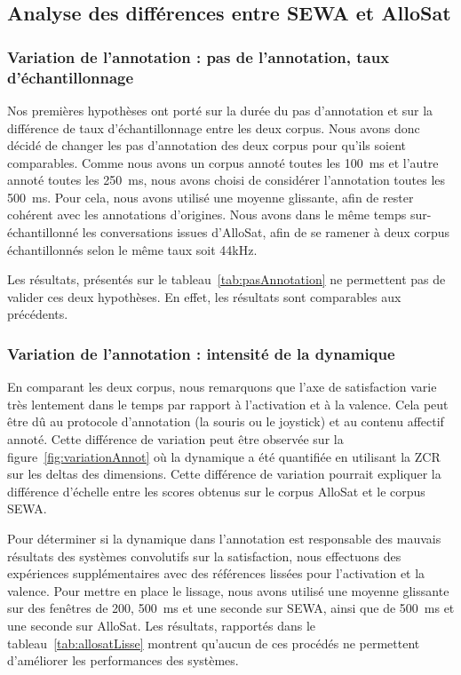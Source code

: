 \subsection{Analyse des différences entre SEWA et AlloSat}

\subsubsection{Variation de l'annotation : pas de l'annotation, taux d'échantillonnage}
Nos premières hypothèses ont porté sur la durée du pas d'annotation et sur la différence de taux d'échantillonnage entre les deux corpus. Nous avons donc décidé de changer les pas d'annotation des deux corpus pour qu'ils soient comparables. Comme nous avons un corpus annoté toutes les 100~ms et l'autre annoté toutes les 250~ms, nous avons choisi de considérer l'annotation toutes les 500~ms. Pour cela, nous avons utilisé une moyenne glissante, afin de rester cohérent avec les annotations d'origines. Nous avons dans le même temps sur-échantillonné les conversations issues d'AlloSat, afin de se ramener à deux corpus échantillonnés selon le même taux soit 44kHz.



Les résultats, présentés sur le tableau~\ref{tab:pasAnnotation} ne permettent pas de valider ces deux hypothèses. En effet, les résultats sont comparables aux précédents.

\subsubsection{Variation de l'annotation : intensité de la dynamique}
En comparant les deux corpus, nous remarquons que l'axe de satisfaction varie très lentement dans le temps par rapport à l'activation et à la valence. Cela peut être dû au protocole d'annotation (la souris ou le joystick) et au contenu affectif annoté. Cette différence de variation peut être observée sur la figure~\ref{fig:variationAnnot} où la dynamique a été quantifiée en utilisant la ZCR sur les deltas des dimensions. Cette différence de variation pourrait expliquer la différence d'échelle entre les scores obtenus sur le corpus AlloSat et le corpus SEWA.



Pour déterminer si la dynamique dans l'annotation est responsable des mauvais résultats des systèmes convolutifs sur la satisfaction, nous effectuons des expériences supplémentaires avec des références lissées pour l'activation et la valence. Pour mettre en place le lissage, nous avons utilisé une moyenne glissante sur des fenêtres de 200, 500~ms et une seconde sur SEWA, ainsi que de 500~ms et une seconde sur AlloSat. Les résultats, rapportés dans le tableau~\ref{tab:allosatLisse} montrent qu'aucun de ces procédés ne permettent d'améliorer les performances des systèmes.

